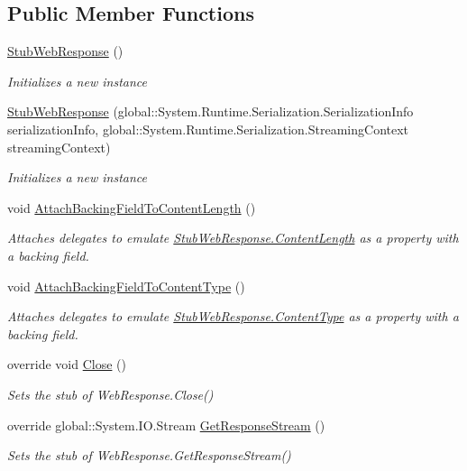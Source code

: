 \subsection*{Public Member Functions}
\begin{DoxyCompactItemize}
\item 
\hyperlink{class_system_1_1_net_1_1_fakes_1_1_stub_web_response_aa32128e255aeec6fcae0775fd0206e23}{Stub\-Web\-Response} ()
\begin{DoxyCompactList}\small\item\em Initializes a new instance\end{DoxyCompactList}\item 
\hyperlink{class_system_1_1_net_1_1_fakes_1_1_stub_web_response_ac262052e506007092b69663a2a5d05d4}{Stub\-Web\-Response} (global\-::\-System.\-Runtime.\-Serialization.\-Serialization\-Info serialization\-Info, global\-::\-System.\-Runtime.\-Serialization.\-Streaming\-Context streaming\-Context)
\begin{DoxyCompactList}\small\item\em Initializes a new instance\end{DoxyCompactList}\item 
void \hyperlink{class_system_1_1_net_1_1_fakes_1_1_stub_web_response_ad9921f5e61743e8eedf5bf670f6452da}{Attach\-Backing\-Field\-To\-Content\-Length} ()
\begin{DoxyCompactList}\small\item\em Attaches delegates to emulate \hyperlink{class_system_1_1_net_1_1_fakes_1_1_stub_web_response_a3942bf9d328579a4b16f1a66bea54103}{Stub\-Web\-Response.\-Content\-Length} as a property with a backing field.\end{DoxyCompactList}\item 
void \hyperlink{class_system_1_1_net_1_1_fakes_1_1_stub_web_response_a4e06cd4282e09a0dca8bbc4fd0339897}{Attach\-Backing\-Field\-To\-Content\-Type} ()
\begin{DoxyCompactList}\small\item\em Attaches delegates to emulate \hyperlink{class_system_1_1_net_1_1_fakes_1_1_stub_web_response_ad4ba405aa10a84da985d59882b919ada}{Stub\-Web\-Response.\-Content\-Type} as a property with a backing field.\end{DoxyCompactList}\item 
override void \hyperlink{class_system_1_1_net_1_1_fakes_1_1_stub_web_response_a65a3bf4d0dff32f8b08855ebbfb41215}{Close} ()
\begin{DoxyCompactList}\small\item\em Sets the stub of Web\-Response.\-Close()\end{DoxyCompactList}\item 
override global\-::\-System.\-I\-O.\-Stream \hyperlink{class_system_1_1_net_1_1_fakes_1_1_stub_web_response_a978c1981fd196ef4d530ec55108f5848}{Get\-Response\-Stream} ()
\begin{DoxyCompactList}\small\item\em Sets the stub of Web\-Response.\-Get\-Response\-Stream()\end{DoxyCompactList}\end{DoxyCompactItemize}
